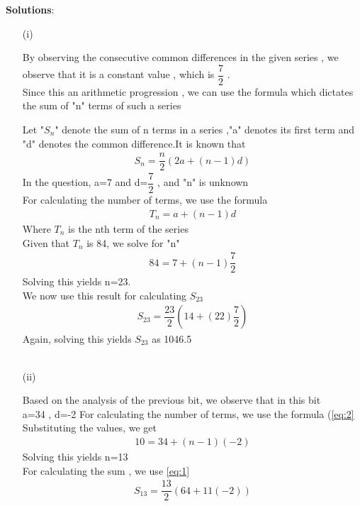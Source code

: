 \documentclass[journal,12pt,twocolumn]{IEEEtran}
\theoremstyle{remark}
\begin{document}
\vspace{0.5cm}
\textbf{Solutions}:
\begin{enumerate}
\item[(i)]   

By observing the consecutive common differences in the given series , we observe that it is a constant value , which is $\dfrac{7}{2}$ .\\
Since this an arithmetic progression , we can use the formula which dictates the sum of "n" terms of such a series

Let "$S_n$" denote the sum of n terms in a series ,"a" denotes its first term and "d" denotes the common difference.It is known that
\begin{align}
{S_n} = \dfrac{n}{2}(2a + (n-1)d)\label{eq:1}
\end{align}
In the question, a=7 and d=$\dfrac{7}{2}$ , and "n" is unknown\\
For calculating the number of terms, we use the formula
\begin{align}
{T_n} = a + (n-1)d\label{eq:2}
\end{align}
Where $T_n$ is the nth term of the series\\
Given that $T_n$ is 84, we solve for "n"
\begin{align}  
84 = 7+(n-1)\dfrac{7}{2}
\end{align}
Solving this yields n=23.\\
We now use this result for calculating $S_{23}$
\begin{align}
    S_{23} = \dfrac{23}{2}(14+(22)\dfrac{7}{2})
    \end{align}
Again, solving this yields $S_{23}$ as 1046.5\\\\

\item[(ii)]

\vspace{0.5cm}
Based on the analysis of the previous bit, we observe that in this bit \\ a=34 , d=-2
For calculating the number of terms, we use the formula (\eqref{eq:2}\\
Substituting the values, we get
\begin{align}
     10 = 34 + (n-1)(-2)
     \end{align}
Solving this yields n=13\\
For calculating the sum , we use \eqref{eq:1}
\begin{align}
 S_{13} = \dfrac{13}{2}(64+11(-2))
 \end{align}


\end{enumerate}
\end{document}
